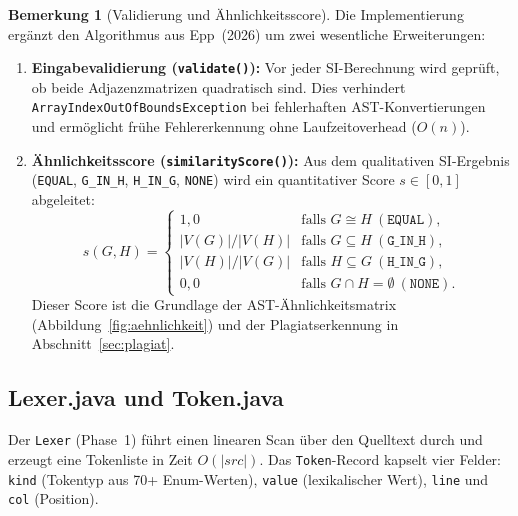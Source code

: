 ﻿\documentclass[a4paper,12pt]{article}
\theoremstyle{definition}
\newtheorem{bemerkung}{Bemerkung}
\begin{document}
\begin{bemerkung}[Validierung und \"{A}hnlichkeitsscore]
Die Implementierung erg\"anzt den Algorithmus aus Epp~(2026) um
zwei wesentliche Erweiterungen:
\begin{enumerate}
    \item \textbf{Eingabevalidierung (\texttt{validate()}):}
    Vor jeder SI-Berechnung wird gepr\"uft, ob beide
    Adjazenzmatrizen quadratisch sind.  Dies verhindert
    \texttt{ArrayIndexOutOfBoundsException} bei fehlerhaften
    AST-Konvertierungen und erm\"oglicht fr\"uhe Fehlererkennung
    ohne Laufzeitoverhead ($O(n)$).

    \item \textbf{\"{A}hnlichkeitsscore (\texttt{similarityScore()}):}
    Aus dem qualitativen SI-Ergebnis (\texttt{EQUAL}, \texttt{G\_IN\_H},
    \texttt{H\_IN\_G}, \texttt{NONE}) wird ein quantitativer Score
    $s \in [0,1]$ abgeleitet:
    \[
    s(G, H) = \begin{cases}
        1{,}0 & \text{falls } G \cong H\ (\texttt{EQUAL}),\\
        |V(G)| / |V(H)| & \text{falls } G \subseteq H\ (\texttt{G\_IN\_H}),\\
        |V(H)| / |V(G)| & \text{falls } H \subseteq G\ (\texttt{H\_IN\_G}),\\
        0{,}0 & \text{falls } G \cap H = \emptyset\ (\texttt{NONE}).
    \end{cases}
    \]
    Dieser Score ist die Grundlage der
    AST-\"{A}hnlichkeitsmatrix (Abbildung~\ref{fig:aehnlichkeit})
    und der Plagiatserkennung in Abschnitt~\ref{sec:plagiat}.
\end{enumerate}
\end{bemerkung}

\subsection{Lexer.java und Token.java}

Der \texttt{Lexer} (Phase~1) f\"uhrt einen linearen Scan
\"uber den Quelltext durch und erzeugt eine Tokenliste in Zeit
$O(|src|)$.  Das \texttt{Token}-Record kapselt vier Felder:
\texttt{kind} (Tokentyp aus 70+ Enum-Werten), \texttt{value}
(lexikalischer Wert), \texttt{line} und \texttt{col} (Position).
\end{document}
